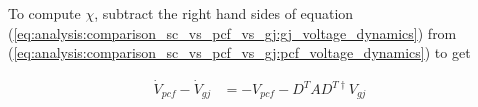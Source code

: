 \begin{enumerate}
\begin{itemize}
To compute $\chi$, subtract the right hand sides of equation (\ref{eq:analysis:comparison_sc_vs_pcf_vs_gj:gj_voltage_dynamics}) from (\ref{eq:analysis:comparison_sc_vs_pcf_vs_gj:pcf_voltage_dynamics}) to get

\begin{align*}
\dot{V}_{pcf} - \dot{V}_{gj} 
&=
-V_{pcf} - D^T A
D^{T \dagger} V_{gj}
\end{align*}

\end{itemize}










\end{enumerate}














